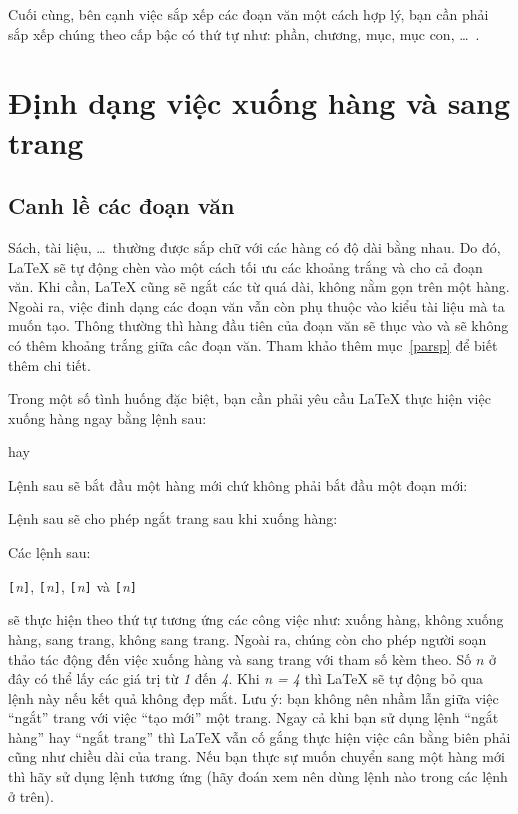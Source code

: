 Cuối cùng, bên cạnh việc sắp xếp các đoạn văn một cách hợp lý, bạn cần phải sắp xếp chúng theo cấp bậc có thứ tự như: phần, chương, mục, mục con, \ldots~.

\section{Định dạng việc xuống hàng và sang trang}
\subsection{Canh lề các đoạn văn}
Sách, tài liệu, \ldots~thường được sắp chữ với các hàng có độ dài bằng nhau. Do đó, \LaTeX{} sẽ tự động chèn vào một cách tối ưu các khoảng trắng và  cho cả đoạn văn. Khi cần, \LaTeX{} cũng sẽ ngắt các từ quá dài, không nằm gọn trên một hàng. Ngoài ra, việc đinh dạng các đoạn văn vẫn còn phụ thuộc vào kiểu tài liệu mà ta muốn tạo. Thông thường thì hàng đầu tiên của đoạn văn sẽ thục vào và sẽ không có thêm khoảng trắng giữa câc đoạn văn. Tham khảo
thêm mục~\ref{parsp} để biết thêm chi tiết.

Trong một số tình huống đặc biệt, bạn cần phải yêu cầu \LaTeX{}
thực hiện việc xuống hàng ngay bằng lệnh sau:
\begin{lscommand}
\ci{\bs} hay 
\end{lscommand}
\noindent Lệnh sau sẽ bắt đầu một hàng mới chứ không phải bắt đầu
một đoạn mới:

\begin{lscommand}
\ci{\bs*}
\end{lscommand}
\noindent Lệnh sau sẽ cho phép ngắt trang sau khi xuống hàng:

\begin{lscommand}
\end{lscommand}
\noindent Các lệnh sau:

\begin{lscommand}
\verb|[|\emph{n}\verb|]|,
\verb|[|\emph{n}\verb|]|,
\verb|[|\emph{n}\verb|]| và
\verb|[|\emph{n}\verb|]|
\end{lscommand}
\noindent sẽ thực hiện theo thứ tự tương ứng các công việc như: xuống hàng, không xuống hàng, sang trang, không sang trang. Ngoài ra, chúng còn cho phép người soạn thảo tác động đến việc xuống hàng và sang trang với tham số kèm theo. Số $n$ ở đây có thể lấy các giá trị từ \emph{1} đến \emph{4}. Khi \emph{n = 4} thì \LaTeX{} sẽ tự động bỏ qua lệnh này nếu kết quả không đẹp mắt. Lưu ý: bạn không nên nhầm lẫn giữa việc ``ngắt'' trang với việc ``tạo mới'' một trang. Ngay cả khi bạn sử dụng lệnh ``ngắt hàng'' hay ``ngắt trang'' thì \LaTeX{} vẫn cố gắng thực hiện việc cân bằng biên phải cũng như chiều dài của trang. Nếu bạn thực sự muốn chuyển sang một hàng mới thì hãy sử dụng lệnh tương ứng (hãy đoán xem nên dùng lệnh nào trong các lệnh ở trên).

